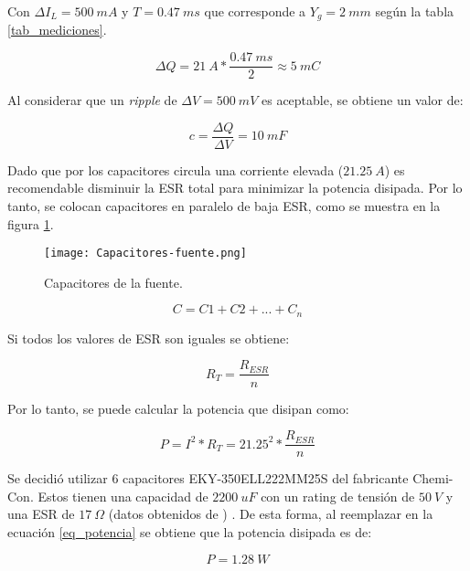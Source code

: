 \noindent Con $\Delta I_L=500 \:mA$ y $T=0.47\:ms$ que corresponde a $Y_g = 2 \:mm$ según la tabla \ref{tab_mediciones}.

\begin{equation} 
	\Delta Q = 21\:A * \frac{0.47\:ms}{2} \approx 5\:mC
\end{equation}

\noindent Al considerar que un \textsl{ripple} de $\Delta V=500 \:mV$ es aceptable, se obtiene un valor de:

\begin{equation} 
	c = \frac{\Delta Q}{\Delta V} = 10 \:mF
\end{equation}

\noindent Dado que por los capacitores circula una corriente elevada ($21.25\:A$) es recomendable disminuir la ESR total para minimizar la potencia disipada. Por lo tanto, se colocan capacitores en paralelo de baja ESR, como se muestra en la figura \ref{fig:img_capacitores-fuente}.

\begin{figure}[H]
	\centering
	\texttt{[image: Capacitores-fuente.png]}
	\caption{Capacitores de la fuente.}
	\label{fig:img_capacitores-fuente}
\end{figure}


\begin{equation} 
	C = C1 + C2 + ... + C_n
\end{equation}


\noindent Si todos los valores de ESR son iguales se obtiene:

\begin{equation} 
	R_T = \frac{R_{ESR}}{n}
\end{equation}

\noindent Por lo tanto, se puede calcular la potencia que disipan como:

\begin{equation}\label{eq_potencia} 
	P = I^2 * R_T = 21.25^2 * \frac{R_{ESR}}{n}
\end{equation}

\noindent Se decidió utilizar 6 capacitores  EKY-350ELL222MM25S del fabricante Chemi-Con. Estos tienen una capacidad de $2200 \:uF$ con un rating de tensión de $50\:V$ y una ESR de $17 \:\Omega$ (datos obtenidos de \cite{EKY-350ELL222MM25S}) . De esta forma, al reemplazar en la ecuación \ref{eq_potencia} se obtiene que la potencia disipada es de: 

\begin{equation} 
	P=1.28\:W
\end{equation}

